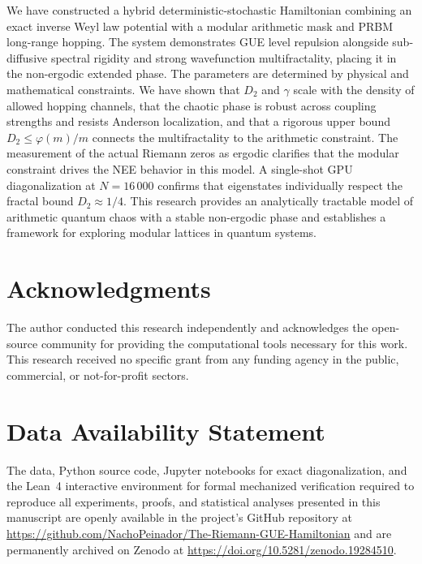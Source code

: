 \documentclass[11pt,a4paper]{article}
\begin{document}
We have constructed a hybrid deterministic-stochastic Hamiltonian combining an exact inverse Weyl law potential with a modular arithmetic mask and PRBM long-range hopping. The system demonstrates GUE level repulsion alongside sub-diffusive spectral rigidity and strong wavefunction multifractality, placing it in the non-ergodic extended phase. The parameters are determined by physical and mathematical constraints. We have shown that $D_2$ and $\gamma$ scale with the density of allowed hopping channels, that the chaotic phase is robust across coupling strengths and resists Anderson localization, and that a rigorous upper bound $D_2 \le \varphi(m)/m$ connects the multifractality to the arithmetic constraint. The measurement of the actual Riemann zeros as ergodic clarifies that the modular constraint drives the NEE behavior in this model. A single-shot GPU diagonalization at $N=16\,000$ confirms that eigenstates individually respect the fractal bound $D_2\approx 1/4$. This research provides an analytically tractable model of arithmetic quantum chaos with a stable non-ergodic phase and establishes a framework for exploring modular lattices in quantum systems.


\section*{Acknowledgments}
The author conducted this research independently and acknowledges the open-source community for providing the computational tools necessary for this work. This research received no specific grant from any funding agency in the public, commercial, or not-for-profit sectors.

\section*{Data Availability Statement}
The data, Python source code, Jupyter notebooks for exact diagonalization, and the Lean~4 interactive environment for formal mechanized verification required to reproduce all experiments, proofs, and statistical analyses presented in this manuscript are openly available in the project's GitHub repository at \url{https://github.com/NachoPeinador/The-Riemann-GUE-Hamiltonian} and are permanently archived on Zenodo at \url{https://doi.org/10.5281/zenodo.19284510}.
\end{document}
